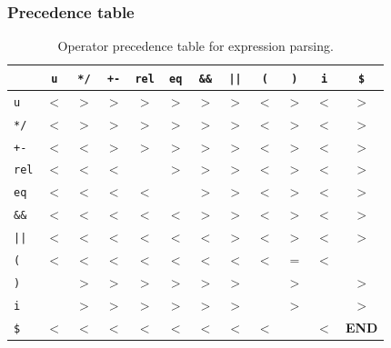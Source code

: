 \documentclass[a4paper]{article}
\newcommand{\term}[1]{\texttt{#1}}
\begin{document}
\subsubsection*{Precedence table}
\begin{table}[htbp]
  \centering
  \small
  \begin{tabular}{@{}l|*{11}{c}@{}}
    \toprule
    & \term{u} & \term{*/} & \term{+-} & \term{rel} & \term{eq} & \term{\&\&} & \term{||} & \term{(} & \term{)} & \term{i} & \term{\$} \\
    \midrule
    \term{u} & $<$ & $>$ & $>$ & $>$ & $>$ & $>$ & $>$ & $<$ & $>$ & $<$ & $>$ \\
    \term{*/} & $<$ & $>$ & $>$ & $>$ & $>$ & $>$ & $>$ & $<$ & $>$ & $<$ & $>$ \\
    \term{+-} & $<$ & $<$ & $>$ & $>$ & $>$ & $>$ & $>$ & $<$ & $>$ & $<$ & $>$ \\
    \term{rel} & $<$ & $<$ & $<$ &  & $>$ & $>$ & $>$ & $<$ & $>$ & $<$ & $>$ \\
    \term{eq} & $<$ & $<$ & $<$ & $<$ &  & $>$ & $>$ & $<$ & $>$ & $<$ & $>$ \\
    \term{\&\&} & $<$ & $<$ & $<$ & $<$ & $<$ & $>$ & $>$ & $<$ & $>$ & $<$ & $>$ \\
    \term{||} & $<$ & $<$ & $<$ & $<$ & $<$ & $<$ & $>$ & $<$ & $>$ & $<$ & $>$ \\
    \term{(} & $<$ & $<$ & $<$ & $<$ & $<$ & $<$ & $<$ & $<$ & $=$ & $<$ &  \\
    \term{)} &  & $>$ & $>$ & $>$ & $>$ & $>$ & $>$ &  & $>$ &  & $>$ \\
    \term{i} &  & $>$ & $>$ & $>$ & $>$ & $>$ & $>$ &  & $>$ &  & $>$ \\
    \term{\$} & $<$ & $<$ & $<$ & $<$ & $<$ & $<$ & $<$ & $<$ &  & $<$ & \textbf{END} \\
    \bottomrule
  \end{tabular}
  \caption{Operator precedence table for expression parsing.}
  \label{tab:precedence}
\end{table}
\end{document}
